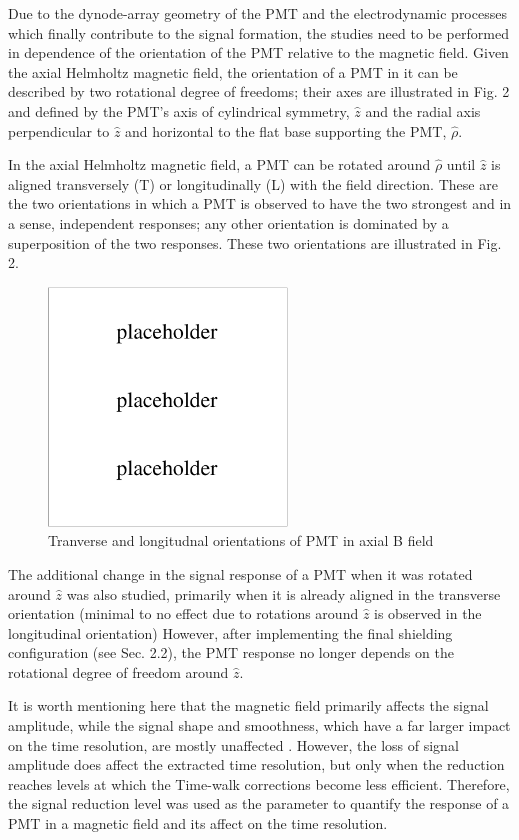 \documentclass[12pt]{article}
\begin{document}
Due to the dynode-array geometry of the PMT and the electrodynamic processes which finally contribute to the signal formation, the studies need to be performed in dependence of the orientation of the PMT relative to the magnetic field. Given the axial Helmholtz magnetic field, the orientation of a PMT in it can be described by two rotational degree of freedoms; their axes are illustrated in Fig. 2 and defined by the PMT's axis of cylindrical symmetry, $\hat{z}$ and the radial axis perpendicular to $\hat{z}$ and horizontal to the flat base supporting the PMT, $\hat{\rho}$.

In the axial Helmholtz magnetic field, a PMT can be rotated around $\hat{\rho}$ until $\hat{z}$ is aligned transversely (T) or longitudinally (L) with the field direction. These are the two orientations in which a PMT is observed to have the two strongest and in a sense, independent responses; any other orientation is dominated by a superposition of the two responses. These two orientations are illustrated in Fig. 2.

\begin{figure}[ht]
  \includegraphics[width=2.5in]{placeholder.pdf} 
  \caption{Tranverse and longitudnal orientations of PMT in axial B field}
  \label{fig2}
\end{figure}

The additional change in the signal response of a PMT when it was rotated around $\hat{z}$ was also studied, primarily when it is already aligned in the transverse orientation (minimal to no effect due to rotations around $\hat{z}$ is observed in the longitudinal orientation) \cite{Steinman} However, after implementing the final shielding configuration (see Sec. 2.2), the PMT response no longer depends on the rotational degree of freedom around $\hat{z}$.

It is worth mentioning here that the magnetic field primarily affects the signal amplitude, while the signal shape and smoothness, which have a far larger impact on the time resolution, are mostly unaffected \cite{Steinman}. However, the loss of signal amplitude does affect the extracted time resolution, but only when the reduction reaches levels at which the Time-walk corrections become less efficient. Therefore, the signal reduction level was used as the parameter to quantify the response of a PMT in a magnetic field and its affect on the time resolution. 
\end{document}
